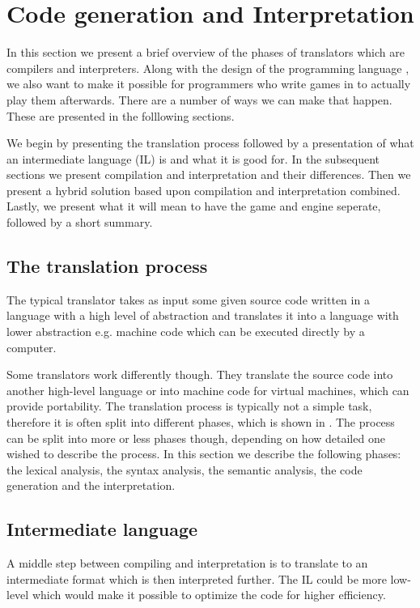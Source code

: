 \section{Code generation and Interpretation}
\label{sec:codegenerationandinterpretation}

In this section we present a brief overview of the phases of translators
which are compilers and interpreters. Along with the design of the programming
language \productname{}, we also want to make it possible for programmers who
write games in \productname{} to actually play them afterwards. There are a
number of ways we can make that happen. These are presented in the folllowing
sections. 

We begin by presenting the translation process followed by a presentation of
what an intermediate language (IL) is and what it is good for. In the subsequent
sections we present compilation and interpretation and their differences. Then
we present a hybrid solution based upon compilation and interpretation combined.
Lastly, we present what it will mean to have the game and engine seperate,
followed by a short summary.

\subsection{The translation process}
\label{sec:translationprocess}
The typical translator takes as input some given source code written in a
language with a high level of abstraction and translates it into a language with
lower abstraction e.g. machine code which can be executed directly by a
computer.
\cite[p. 44]{sebesta2013} 

Some translators work differently though. They translate the source code into
another high-level language or into machine code for virtual machines, which can
provide portability. The translation process is typically not a simple task,
therefore it is often split into different phases, which is shown in
. The process can be split into more or less phases
though, depending on how detailed one wished to describe the process. In this
section we describe the following phases: the lexical analysis, the syntax
analysis, the semantic analysis, the code generation and the interpretation.



\subsection{Intermediate language}
\label{sec:intermediatelanguage}
A middle step between compiling and interpretation is to translate to an
intermediate format which is then interpreted further. The IL could be more
low-level which would make it possible to optimize the code for higher
efficiency.

